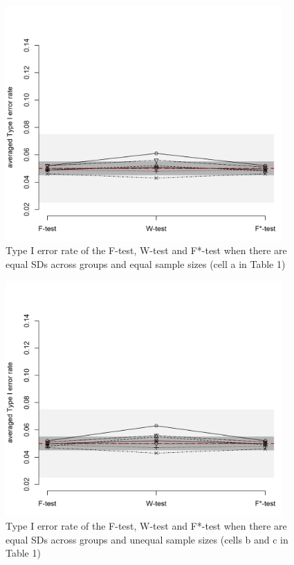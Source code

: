 \documentclass[man,floatsintext]{apa6}
\begin{document}
\begin{figure}
\includegraphics[width=400px]{Rmarkdown folder/Rmarkdown inputs/Fig1A} \caption{Type I error rate of the F-test, W-test and F*-test when there are equal SDs across groups and equal sample sizes (cell a in Table 1)}\label{fig:unnamed-chunk-2}
\end{figure}

\begin{figure}
\includegraphics[width=400px]{Rmarkdown folder/Rmarkdown inputs/Fig1B} \caption{Type I error rate of the F-test, W-test and F*-test when there are equal SDs across groups and unequal sample sizes (cells b and c in Table 1)}\label{fig:unnamed-chunk-3}
\end{figure}
\end{document}

